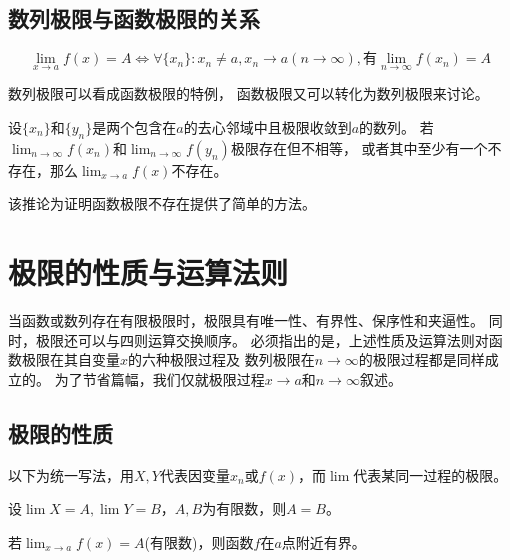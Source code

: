 \subsection{数列极限与函数极限的关系}
\begin{theorem}[数列极限与函数极限的关系]
  \begin{displaymath}
    \lim_{x\to a} f(x) = A
    \iff \forall \{x_n\}: x_n\neq a, x_n\to a(n\to\infty),
    \text{有}\lim_{n\to\infty} f(x_n) = A
  \end{displaymath}
\end{theorem}
\begin{remark}
  数列极限可以看成函数极限的特例，
  函数极限又可以转化为数列极限来讨论。
\end{remark}

\begin{corollary}
  设$\{x_n\}$和$\{y_n\}$是两个包含在$a$的去心邻域中且极限收敛到$a$的数列。
  若$\lim_{n\to\infty}f(x_n)$和$\lim_{n\to\infty}f(y_n)$极限存在但不相等，
  或者其中至少有一个不存在，那么$\lim_{x\to a}f(x)$不存在。
\end{corollary}
\begin{remark}
  该推论为证明函数极限不存在提供了简单的方法。
\end{remark}

\section{极限的性质与运算法则} \label{sec:limit-property}
当函数或数列存在有限极限时，极限具有唯一性、有界性、保序性和夹逼性。
同时，极限还可以与四则运算交换顺序。
必须指出的是，上述性质及运算法则对函数极限在其自变量$x$的六种极限过程及
数列极限在$n\to\infty$的极限过程都是同样成立的。
为了节省篇幅，我们仅就极限过程$x\to a$和$n\to\infty$叙述。

\subsection{极限的性质}
以下为统一写法，用$X,Y$代表因变量$x_n$或$f(x)$，而$\lim$代表某同一过程的极限。

\begin{theorem}[唯一性]
  设$\lim X=A,\lim Y=B$，$A,B$为有限数，则$A=B$。
\end{theorem}

\begin{theorem}[收敛函数的局部有界性]
  若$\lim_{x\to a}f(x)=A$(有限数)，则函数$f$在$a$点附近有界。
\end{theorem}

